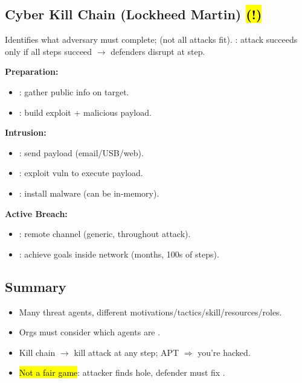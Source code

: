 \subsection{Cyber Kill Chain (Lockheed Martin) \hl{(!)}}
Identifies what adversary must complete;  (not all attacks fit). : attack succeeds only if all steps succeed $\to$ defenders disrupt at  step.

\textbf{Preparation:}
\begin{itemize}
\item {}: gather public info on target.
\item {}: build exploit + malicious payload.
\end{itemize}
\textbf{Intrusion:}
\begin{itemize}
\item {}: send payload (email/USB/web).
\item {}: exploit vuln to execute payload.
\item {}: install malware (can be in-memory).
\end{itemize}
\textbf{Active Breach:}
\begin{itemize}
\item {}: remote channel (generic, throughout attack).
\item {}: achieve goals inside network (months, 100s of steps).
\end{itemize}

\subsection{Summary}
\begin{itemize}
\item Many threat agents, different motivations/tactics/skill/resources/roles.
\item Orgs must consider which agents are .
\item Kill chain $\to$ kill attack at any step; APT $\Rightarrow$ you're hacked.
\item \hl{Not a fair game}: attacker finds  hole, defender must fix .
\end{itemize}


